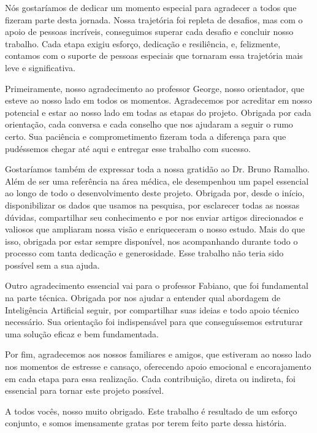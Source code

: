 \begin{agradecimentos}

Nós gostaríamos de dedicar um momento especial para agradecer a todos que fizeram parte desta jornada. Nossa trajetória foi repleta de desafios, mas com o apoio de pessoas incríveis, conseguimos superar cada desafio e concluir nosso trabalho.  Cada etapa exigiu esforço, dedicação e resiliência, e, felizmente, contamos com o suporte de pessoas especiais que tornaram essa trajetória mais leve e significativa.

Primeiramente, nosso agradecimento ao professor George, nosso orientador, que esteve ao nosso lado em todos os momentos. Agradecemos por acreditar em nosso potencial e estar ao nosso lado em todas as etapas do projeto. Obrigada por cada orientação, cada conversa e cada conselho que nos ajudaram a seguir o rumo certo. Sua paciência e comprometimento fizeram toda a diferença para que pudéssemos chegar até aqui e entregar esse trabalho com sucesso.

Gostaríamos também de expressar toda a nossa gratidão ao Dr. Bruno Ramalho. Além de ser uma referência na área médica,  ele desempenhou um papel essencial ao longo de todo o desenvolvimento deste projeto. Obrigada por, desde o início, disponibilizar os dados que usamos na pesquisa, por esclarecer todas as nossas dúvidas, compartilhar seu conhecimento e por nos enviar artigos direcionados e valiosos que ampliaram nossa visão e enriqueceram o nosso estudo. Mais do que isso, obrigada por estar sempre disponível, nos acompanhando durante todo o processo com tanta dedicação e generosidade. Esse trabalho não teria sido possível sem a sua ajuda.

Outro agradecimento essencial vai para o professor Fabiano, que foi fundamental na parte técnica. Obrigada por nos ajudar a entender qual abordagem de Inteligência Artificial seguir, por compartilhar suas ideias e todo apoio técnico necessário. Sua orientação foi indispensável para que conseguíssemos estruturar uma solução eficaz e bem fundamentada.

Por fim, agradecemos aos nossos familiares e amigos, que estiveram ao nosso lado nos momentos de estresse e cansaço, oferecendo apoio emocional e encorajamento em cada etapa para essa realização. Cada contribuição, direta ou indireta, foi essencial para tornar este projeto possível.

A todos vocês, nosso muito obrigado. Este trabalho é resultado de um esforço conjunto, e somos imensamente gratas por terem feito parte dessa história.

\end{agradecimentos}
